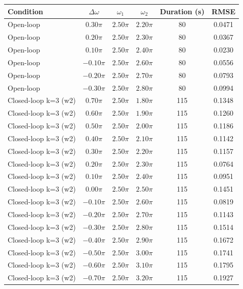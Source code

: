 \begin{tabular}{lccccc}
\toprule
Condition & $\Delta\omega$ & $\omega_1$ & $\omega_2$ & Duration (s) & RMSE \\
\midrule
Open-loop & $0.30\pi$ & $2.50\pi$ & $2.20\pi$ & 80 & 0.0471 \\
Open-loop & $0.20\pi$ & $2.50\pi$ & $2.30\pi$ & 80 & 0.0367 \\
Open-loop & $0.10\pi$ & $2.50\pi$ & $2.40\pi$ & 80 & 0.0230 \\
Open-loop & $-0.10\pi$ & $2.50\pi$ & $2.60\pi$ & 80 & 0.0556 \\
Open-loop & $-0.20\pi$ & $2.50\pi$ & $2.70\pi$ & 80 & 0.0793 \\
Open-loop & $-0.30\pi$ & $2.50\pi$ & $2.80\pi$ & 80 & 0.0994 \\
Closed-loop k=3 (w2) & $0.70\pi$ & $2.50\pi$ & $1.80\pi$ & 115 & 0.1348 \\
Closed-loop k=3 (w2) & $0.60\pi$ & $2.50\pi$ & $1.90\pi$ & 115 & 0.1260 \\
Closed-loop k=3 (w2) & $0.50\pi$ & $2.50\pi$ & $2.00\pi$ & 115 & 0.1186 \\
Closed-loop k=3 (w2) & $0.40\pi$ & $2.50\pi$ & $2.10\pi$ & 115 & 0.1142 \\
Closed-loop k=3 (w2) & $0.30\pi$ & $2.50\pi$ & $2.20\pi$ & 115 & 0.1157 \\
Closed-loop k=3 (w2) & $0.20\pi$ & $2.50\pi$ & $2.30\pi$ & 115 & 0.0764 \\
Closed-loop k=3 (w2) & $0.10\pi$ & $2.50\pi$ & $2.40\pi$ & 115 & 0.0951 \\
Closed-loop k=3 (w2) & $0.00\pi$ & $2.50\pi$ & $2.50\pi$ & 115 & 0.1451 \\
Closed-loop k=3 (w2) & $-0.10\pi$ & $2.50\pi$ & $2.60\pi$ & 115 & 0.0819 \\
Closed-loop k=3 (w2) & $-0.20\pi$ & $2.50\pi$ & $2.70\pi$ & 115 & 0.1143 \\
Closed-loop k=3 (w2) & $-0.30\pi$ & $2.50\pi$ & $2.80\pi$ & 115 & 0.1514 \\
Closed-loop k=3 (w2) & $-0.40\pi$ & $2.50\pi$ & $2.90\pi$ & 115 & 0.1672 \\
Closed-loop k=3 (w2) & $-0.50\pi$ & $2.50\pi$ & $3.00\pi$ & 115 & 0.1741 \\
Closed-loop k=3 (w2) & $-0.60\pi$ & $2.50\pi$ & $3.10\pi$ & 115 & 0.1795 \\
Closed-loop k=3 (w2) & $-0.70\pi$ & $2.50\pi$ & $3.20\pi$ & 115 & 0.1927 \\

\end{tabular}
